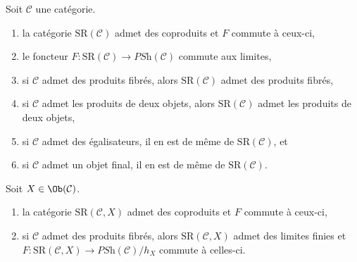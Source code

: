 \begin{lemma}
\label{lemma-coprod-prod-SR}
Soit $\mathcal{C}$ une catégorie.
\begin{enumerate}
\item la catégorie $\text{SR}(\mathcal{C})$ admet des coproduits
et $F$ commute à ceux-ci,
\item le foncteur $F : \text{SR}(\mathcal{C}) \to \textit{PSh}(\mathcal{C})$
commute aux limites,
\item si $\mathcal{C}$ admet des produits fibrés, alors $\text{SR}(\mathcal{C})$
admet des produits fibrés,
\item si $\mathcal{C}$ admet les produits de deux objets, alors
$\text{SR}(\mathcal{C})$ admet les produits de deux objets,
\item si $\mathcal{C}$ admet des égalisateurs, il en est de même de $\text{SR}(\mathcal{C})$, et
\item si $\mathcal{C}$ admet un objet final, il en est de même de $\text{SR}(\mathcal{C})$.
\end{enumerate}
Soit $X \in \Ob(\mathcal{C})$.
\begin{enumerate}
\item la catégorie $\text{SR}(\mathcal{C}, X)$ admet des coproduits
et $F$ commute à ceux-ci,
\item si $\mathcal{C}$ admet des produits fibrés, alors $\text{SR}(\mathcal{C}, X)$
admet des limites finies et
$F : \text{SR}(\mathcal{C}, X) \to \textit{PSh}(\mathcal{C})/h_X$
commute à celles-ci.
\end{enumerate}
\end{lemma}

